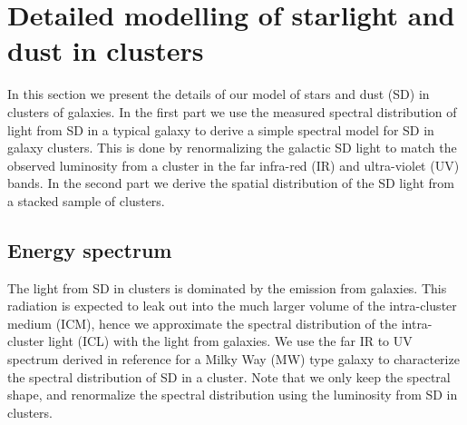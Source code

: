 \documentclass[10pt,aps,pra,reprint,amsmath,amsfonts,amssymb,showpacs,nofootinbib,floatfix]{revtex4-1}
\begin{document}
%


\vspace{-0.7cm}

%
%

\appendix

\section{Detailed modelling of starlight and dust in clusters}
\label{sect:SD}
In this section we present the details of our model of stars and dust
(SD) in clusters of galaxies. In the first part we use the measured
spectral distribution of light from SD in a typical galaxy to derive a
simple spectral model for SD in galaxy clusters. This is done by
renormalizing the galactic SD light to match the observed luminosity
from a cluster in the far infra-red (IR) and ultra-violet (UV) bands. In
the second part we derive the spatial distribution of the SD light
from a stacked sample of clusters.

\subsection{Energy spectrum}
The light from SD in clusters is dominated by the emission from
galaxies. This radiation is expected to leak out into the much larger
volume of the intra-cluster medium (ICM), hence we approximate the
spectral distribution of the intra-cluster light (ICL) with the light
from galaxies. We use the far IR to UV spectrum derived in reference
\cite{2006ApJ...648L..29P} for a Milky Way (MW) type galaxy to
characterize the spectral distribution of SD in a cluster. Note that
we only keep the spectral shape, and renormalize the spectral
distribution using the luminosity from SD in clusters.
\end{document}
